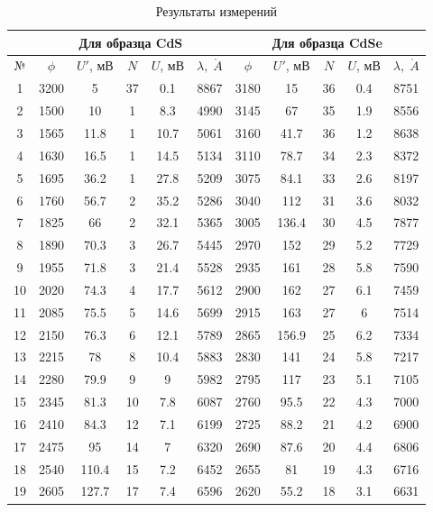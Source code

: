 \documentclass[12pt]{kiarticle} %
\newcommand{\an}{\ensuremath{\mathring{A}}}
\begin{document}
	\begin{table}[h]
		\caption{Результаты измерений}
		\begin{center}
			\begin{tabular}{|c|ccccc|ccccc|}
				\hline
				& \multicolumn{5}{|c|}{Для образца CdS} & \multicolumn{5}{|c|}{Для образца CdSe} \\
				\hline
				№ & $ \phi  $ & $ U' $, мВ &  $ N $ & $ U $, мВ & $ \lambda, \; \an $ &  $ \phi  $ & $ U' $, мВ &  $ N $ & $ U $, мВ & $ \lambda, \; \an $ \\
				\hline
				 1 & 3200 & 5 & 37 & 0.1 & 8867 & 3180 & 15 & 36 & 0.4 & 8751 \\
				2 & 1500 & 10 & 1 & 8.3 & 4990 & 3145 & 67 & 35 & 1.9 & 8556 \\
				3 & 1565 & 11.8 & 1 & 10.7 & 5061 & 3160 & 41.7 & 36 & 1.2 & 8638 \\
				4 & 1630 & 16.5 & 1 & 14.5 & 5134 & 3110 & 78.7 & 34 & 2.3 & 8372 \\
				5 & 1695 & 36.2 & 1 & 27.8 & 5209 & 3075 & 84.1 & 33 & 2.6 & 8197 \\
				6 & 1760 & 56.7 & 2 & 35.2 & 5286 & 3040 & 112 & 31 & 3.6 & 8032 \\
				7 & 1825 & 66 & 2 & 32.1 & 5365 & 3005 & 136.4 & 30 & 4.5 & 7877 \\
				8 & 1890 & 70.3 & 3 & 26.7 & 5445 & 2970 & 152 & 29 & 5.2 & 7729 \\
				9 & 1955 & 71.8 & 3 & 21.4 & 5528 & 2935 & 161 & 28 & 5.8 & 7590 \\
				10 & 2020 & 74.3 & 4 & 17.7 & 5612 & 2900 & 162 & 27 & 6.1 & 7459 \\
				11 & 2085 & 75.5 & 5 & 14.6 & 5699 & 2915 & 163 & 27 & 6 & 7514 \\
				12 & 2150 & 76.3 & 6 & 12.1 & 5789 & 2865 & 156.9 & 25 & 6.2 & 7334 \\
				13 & 2215 & 78 & 8 & 10.4 & 5883 & 2830 & 141 & 24 & 5.8 & 7217 \\
				14 & 2280 & 79.9 & 9 & 9 & 5982 & 2795 & 117 & 23 & 5.1 & 7105 \\
				15 & 2345 & 81.3 & 10 & 7.8 & 6087 & 2760 & 95.5 & 22 & 4.3 & 7000 \\
				16 & 2410 & 84.3 & 12 & 7.1 & 6199 & 2725 & 88.2 & 21 & 4.2 & 6900 \\
				17 & 2475 & 95 & 14 & 7 & 6320 & 2690 & 87.6 & 20 & 4.4 & 6806 \\
				18 & 2540 & 110.4 & 15 & 7.2 & 6452 & 2655 & 81 & 19 & 4.3 & 6716 \\
				19 & 2605 & 127.7 & 17 & 7.4 & 6596 & 2620 & 55.2 & 18 & 3.1 & 6631 \\

\end{tabular}
\end{center}
\end{table}
\end{document}
